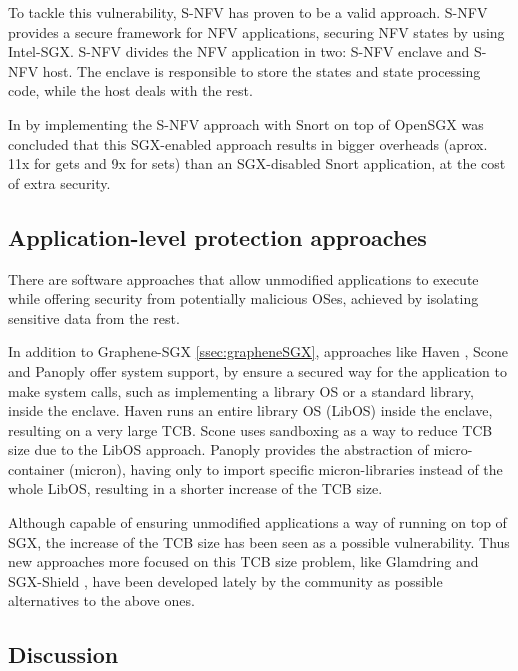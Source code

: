 To tackle this vulnerability, S-NFV has proven to be a valid approach. 
S-NFV provides a secure framework for NFV applications, securing NFV states by using Intel-SGX. S-NFV divides the NFV application in two: S-NFV enclave and S-NFV host. The enclave is responsible to store the states and state processing code, while the host deals with the rest.

In \cite{sNFVPaper} by implementing the S-NFV approach with Snort \cite{snortPaper} on top of OpenSGX was concluded that this SGX-enabled approach results in bigger overheads (aprox. 11x for gets and 9x for sets) than an SGX-disabled Snort application, at the cost of extra security.



\subsection{Application-level protection approaches}
\label{ssec:sgx_applvl_frameworks}

There are software approaches that allow unmodified applications to execute while offering security from potentially malicious OSes, achieved by isolating sensitive data from the rest. 

In addition to Graphene-SGX \ref{ssec:grapheneSGX}, approaches like Haven \cite{havenPaper}, Scone \cite{sconePaper} and Panoply \cite{panoplyPaper} offer system support, by ensure a secured way for the application to make system calls, such as implementing a library OS or a standard library, inside the enclave. 
Haven runs an entire library OS (LibOS) inside the enclave, resulting on a very large TCB. 
Scone uses sandboxing as a way to reduce TCB size due to the LibOS approach.
Panoply provides the abstraction of micro-container (micron), having only to import specific micron-libraries instead of the whole LibOS, resulting in a shorter increase of the TCB size. 

Although capable of ensuring unmodified applications a way of running on top of SGX, the increase of the TCB size has been seen as a possible vulnerability. 
Thus new approaches more focused on this TCB size problem, like Glamdring \cite{glamdringPaper} and SGX-Shield \cite{sgxShieldPaper}, have been developed lately by the community as possible alternatives to the above ones.




\subsection{Discussion}
\label{ssec:sgx_frameworks_discussion}

